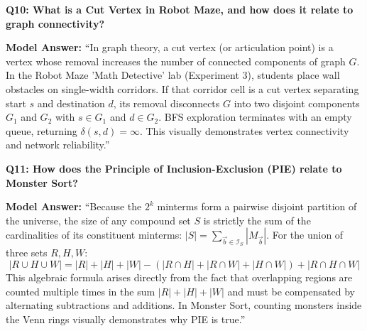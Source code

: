 \documentclass[11pt,a4paper]{article}
\theoremstyle{definition}
\begin{document}
\begin{vivabox}
\textbf{Q10: What is a Cut Vertex in Robot Maze, and how does it relate to graph connectivity?}

\textbf{Model Answer:}
``In graph theory, a cut vertex (or articulation point) is a vertex whose removal increases the number of connected components of graph $G$. In the Robot Maze 'Math Detective' lab (Experiment 3), students place wall obstacles on single-width corridors. If that corridor cell is a cut vertex separating start $s$ and destination $d$, its removal disconnects $G$ into two disjoint components $G_1$ and $G_2$ with $s \in G_1$ and $d \in G_2$. BFS exploration terminates with an empty queue, returning $\delta(s, d) = \infty$. This visually demonstrates vertex connectivity and network reliability.''
\end{vivabox}

\begin{vivabox}
\textbf{Q11: How does the Principle of Inclusion-Exclusion (PIE) relate to Monster Sort?}

\textbf{Model Answer:}
``Because the $2^k$ minterms form a pairwise disjoint partition of the universe, the size of any compound set $S$ is strictly the sum of the cardinalities of its constituent minterms: $|S| = \sum_{\vec{b} \in \mathcal{I}_S} |M_{\vec{b}}|$. For the union of three sets $R, H, W$:
$$|R \cup H \cup W| = |R| + |H| + |W| - (|R \cap H| + |R \cap W| + |H \cap W|) + |R \cap H \cap W|$$
This algebraic formula arises directly from the fact that overlapping regions are counted multiple times in the sum $|R| + |H| + |W|$ and must be compensated by alternating subtractions and additions. In Monster Sort, counting monsters inside the Venn rings visually demonstrates why PIE is true.''
\end{vivabox}
\end{document}
